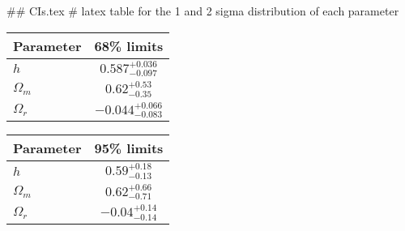 ## CIs.tex
# latex table for the 1 and 2 sigma distribution of each parameter

\begin{tabular} { l  c}
 Parameter &  68\% limits\\
\hline
{\boldmath$h              $} & $0.587^{+0.036}_{-0.097}   $\\
{\boldmath$\Omega_m       $} & $0.62^{+0.53}_{-0.35}      $\\
{\boldmath$\Omega_r       $} & $-0.044^{+0.066}_{-0.083}  $\\
\hline
\end{tabular}

\begin{tabular} { l  c}
 Parameter &  95\% limits\\
\hline
{\boldmath$h              $} & $0.59^{+0.18}_{-0.13}      $\\
{\boldmath$\Omega_m       $} & $0.62^{+0.66}_{-0.71}      $\\
{\boldmath$\Omega_r       $} & $-0.04^{+0.14}_{-0.14}     $\\
\hline
\end{tabular}
